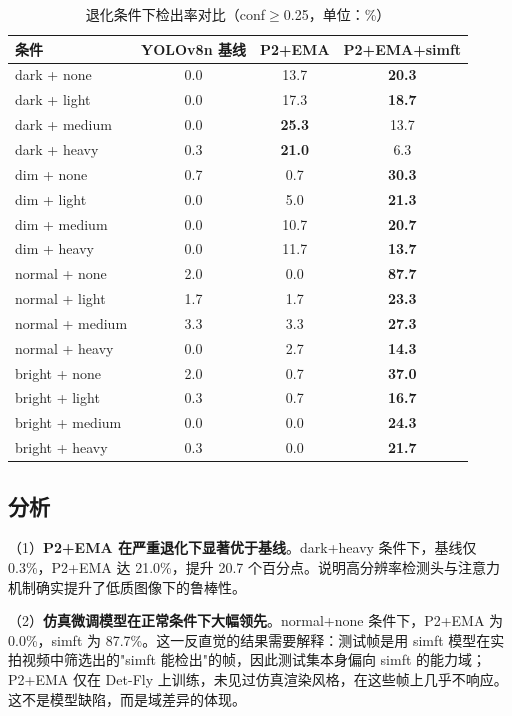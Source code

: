 \begin{table}[htbp]
\centering
\caption{退化条件下检出率对比（conf$\ge$0.25，单位：\%）}
\label{tab:e4}
\small
\begin{tabular}{lccc}
\toprule
\textbf{条件} & \textbf{YOLOv8n 基线} & \textbf{P2+EMA} & \textbf{P2+EMA+simft} \\
\midrule
dark + none & 0.0 & 13.7 & \textbf{20.3} \\
dark + light & 0.0 & 17.3 & \textbf{18.7} \\
dark + medium & 0.0 & \textbf{25.3} & 13.7 \\
dark + heavy & 0.3 & \textbf{21.0} & 6.3 \\
dim + none & 0.7 & 0.7 & \textbf{30.3} \\
dim + light & 0.0 & 5.0 & \textbf{21.3} \\
dim + medium & 0.0 & 10.7 & \textbf{20.7} \\
dim + heavy & 0.0 & 11.7 & \textbf{13.7} \\
normal + none & 2.0 & 0.0 & \textbf{87.7} \\
normal + light & 1.7 & 1.7 & \textbf{23.3} \\
normal + medium & 3.3 & 3.3 & \textbf{27.3} \\
normal + heavy & 0.0 & 2.7 & \textbf{14.3} \\
bright + none & 2.0 & 0.7 & \textbf{37.0} \\
bright + light & 0.3 & 0.7 & \textbf{16.7} \\
bright + medium & 0.0 & 0.0 & \textbf{24.3} \\
bright + heavy & 0.3 & 0.0 & \textbf{21.7} \\
\bottomrule
\end{tabular}
\end{table}

\subsection{分析}

（1）\textbf{P2+EMA 在严重退化下显著优于基线}。dark+heavy 条件下，基线仅 0.3\%，P2+EMA 达 21.0\%，提升 20.7 个百分点。说明高分辨率检测头与注意力机制确实提升了低质图像下的鲁棒性。

（2）\textbf{仿真微调模型在正常条件下大幅领先}。normal+none 条件下，P2+EMA 为 0.0\%，simft 为 87.7\%。这一反直觉的结果需要解释：测试帧是用 simft 模型在实拍视频中筛选出的"simft 能检出"的帧，因此测试集本身偏向 simft 的能力域；P2+EMA 仅在 Det-Fly 上训练，未见过仿真渲染风格，在这些帧上几乎不响应。这不是模型缺陷，而是域差异的体现。

